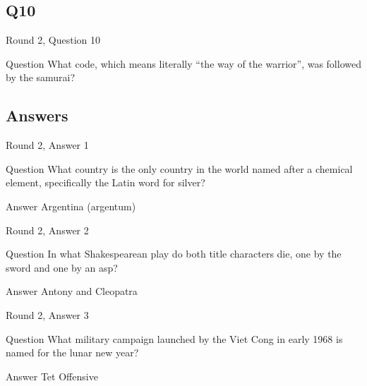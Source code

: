 \documentclass[11pt]{beamer}
\begin{document}
\subsection*{Q10}
\begin{frame}[t]{Round 2, Question 10}
\vspace{2em}
\begin{block}{Question}
What code, which means literally ``the way of the warrior'', was followed by the samurai\@?
\end{block}
\end{frame}
    
\subsection{Answers}

\begin{frame}[t]{Round 2, Answer 1}
\vspace{2em}
\begin{block}{Question}
What country is the only country in the world named after a chemical element, specifically the Latin word for silver\@?
\end{block}
\pause{}
\begin{block}{Answer}
Argentina (argentum)
\end{block}
\end{frame}
    

\begin{frame}[t]{Round 2, Answer 2}
\vspace{2em}
\begin{block}{Question}
In what Shakespearean play do both title characters die, one by the sword and one by an asp\@?
\end{block}
\pause{}
\begin{block}{Answer}
Antony and Cleopatra
\end{block}
\end{frame}
    

\begin{frame}[t]{Round 2, Answer 3}
\vspace{2em}
\begin{block}{Question}
What military campaign launched by the Viet Cong in early 1968 is named for the lunar new year\@?
\end{block}
\pause{}
\begin{block}{Answer}
Tet Offensive
\end{block}
\end{frame}
    
\end{document}
